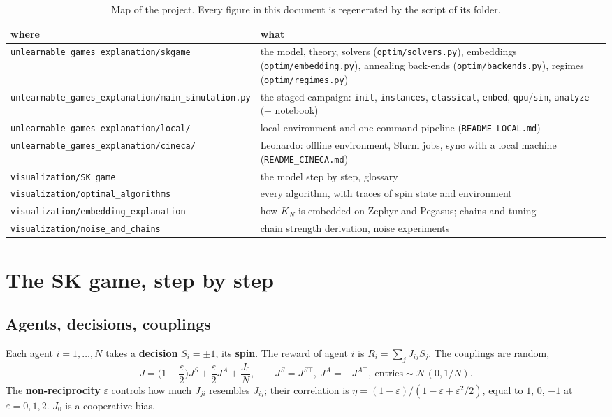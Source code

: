 \documentclass[11pt,a4paper]{article}
\newcommand{\code}[1]{\nolinkurl{#1}}
\newcommand{\term}[1]{\textbf{#1}}
\begin{document}
\begin{table}[H]\centering\small
\begin{tabularx}{\linewidth}{L{5.2cm}X}
\toprule
where & what \\
\midrule
\code{unlearnable_games_explanation/skgame} & the model, theory, solvers (\code{optim/solvers.py}), embeddings
(\code{optim/embedding.py}), annealing back-ends (\code{optim/backends.py}), regimes (\code{optim/regimes.py}) \\
\code{unlearnable_games_explanation/main_simulation.py} & the staged campaign: \code{init}, \code{instances}, \code{classical},
\code{embed}, \code{qpu}/\code{sim}, \code{analyze} (+ notebook) \\
\code{unlearnable_games_explanation/local/} & local environment and one-command pipeline (\code{README_LOCAL.md}) \\
\code{unlearnable_games_explanation/cineca/} & Leonardo: offline environment, Slurm jobs, sync with a local machine (\code{README_CINECA.md}) \\
\code{visualization/SK_game} & the model step by step, glossary \\
\code{visualization/optimal_algorithms} & every algorithm, with traces of spin state and environment \\
\code{visualization/embedding_explanation} & how $K_N$ is embedded on Zephyr and Pegasus; chains and tuning \\
\code{visualization/noise_and_chains} & chain strength derivation, noise experiments \\
\bottomrule
\end{tabularx}
\caption{Map of the project. Every figure in this document is regenerated by the script of its folder.}
\end{table}

\section{The SK game, step by step}

\subsection{Agents, decisions, couplings}
Each agent $i=1,\dots,N$ takes a \term{decision} $S_i=\pm1$, its \term{spin}. The reward of agent $i$ is
$R_i=\sum_jJ_{ij}S_j$. The couplings are random,
\begin{equation}
J=\Big(1-\frac{\varepsilon}{2}\Big)J^S+\frac{\varepsilon}{2}J^A+\frac{J_0}{N},\qquad
J^S=J^{S\top},\ J^A=-J^{A\top},\ \text{entries}\sim\mathcal N(0,1/N).
\end{equation}
The \term{non-reciprocity} $\varepsilon$ controls how much $J_{ji}$ resembles $J_{ij}$; their correlation is
$\eta=(1-\varepsilon)/(1-\varepsilon+\varepsilon^2/2)$, equal to $1$, $0$, $-1$ at $\varepsilon=0,1,2$.
$J_0$ is a cooperative bias.
\end{document}
